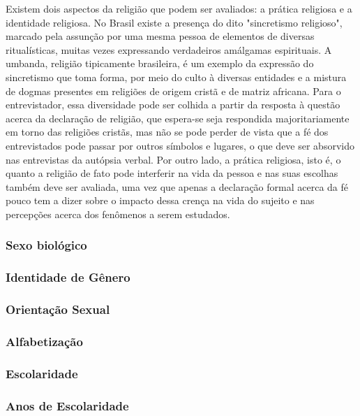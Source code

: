 Existem dois aspectos da religião que podem ser avaliados: a prática religiosa e a identidade religiosa. No Brasil existe a presença do dito "sincretismo religioso", marcado pela assunção por uma mesma pessoa de elementos de diversas ritualísticas, muitas vezes expressando verdadeiros amálgamas espirituais. A umbanda, religião tipicamente brasileira, é um exemplo da expressão do sincretismo que toma forma, por meio do culto à diversas entidades e a mistura de dogmas presentes em religiões de origem cristã e de matriz africana. Para o entrevistador, essa diversidade pode ser colhida a partir da resposta à questão acerca da declaração de religião, que espera-se seja respondida majoritariamente em torno das religiões cristãs, mas não se pode perder de vista que a fé dos entrevistados pode passar por outros símbolos e lugares, o que deve ser absorvido nas entrevistas da autópsia verbal. 
Por outro lado, a prática religiosa, isto é, o quanto a religião de fato pode interferir na vida da pessoa e nas suas escolhas também deve ser avaliada, uma vez que apenas a declaração formal acerca da fé pouco tem a dizer sobre o impacto dessa crença na vida do sujeito e nas percepções acerca dos fenômenos a serem estudados.

\subsubsection{Sexo biológico}

\subsubsection{Identidade de Gênero}

\subsubsection{Orientação Sexual}

\subsubsection{Alfabetização}

\subsubsection{Escolaridade}

\subsubsection{Anos de Escolaridade}

